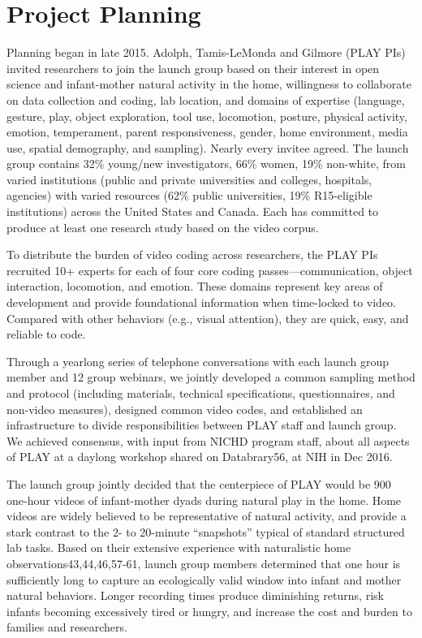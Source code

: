 \documentclass[english,man]{apa6}
\theoremstyle{definition}
\theoremstyle{definition}
\theoremstyle{definition}
\theoremstyle{remark}
\begin{document}
\section{Project Planning}\label{project-planning}

Planning began in late 2015. Adolph, Tamis-LeMonda and Gilmore (PLAY
PIs) invited researchers to join the launch group based on their
interest in open science and infant-mother natural activity in the home,
willingness to collaborate on data collection and coding, lab location,
and domains of expertise (language, gesture, play, object exploration,
tool use, locomotion, posture, physical activity, emotion, temperament,
parent responsiveness, gender, home environment, media use, spatial
demography, and sampling). Nearly every invitee agreed. The launch group
contains 32\% young/new investigators, 66\% women, 19\% non-white, from
varied institutions (public and private universities and colleges,
hospitals, agencies) with varied resources (62\% public universities,
19\% R15-eligible institutions) across the United States and Canada.
Each has committed to produce at least one research study based on the
video corpus.

To distribute the burden of video coding across researchers, the PLAY
PIs recruited 10+ experts for each of four core coding
passes---communication, object interaction, locomotion, and emotion.
These domains represent key areas of development and provide
foundational information when time-locked to video. Compared with other
behaviors (e.g., visual attention), they are quick, easy, and reliable
to code.

Through a yearlong series of telephone conversations with each launch
group member and 12 group webinars, we jointly developed a common
sampling method and protocol (including materials, technical
specifications, questionnaires, and non-video measures), designed common
video codes, and established an infrastructure to divide
responsibilities between PLAY staff and launch group. We achieved
consensus, with input from NICHD program staff, about all aspects of
PLAY at a daylong workshop shared on Databrary56, at NIH in Dec 2016.

The launch group jointly decided that the centerpiece of PLAY would be
900 one-hour videos of infant-mother dyads during natural play in the
home. Home videos are widely believed to be representative of natural
activity, and provide a stark contrast to the 2- to 20-minute
\enquote{snapshots} typical of standard structured lab tasks. Based on
their extensive experience with naturalistic home
observations43,44,46,57-61, launch group members determined that one
hour is sufficiently long to capture an ecologically valid window into
infant and mother natural behaviors. Longer recording times produce
diminishing returns, risk infants becoming excessively tired or hungry,
and increase the cost and burden to families and researchers.
\end{document}

